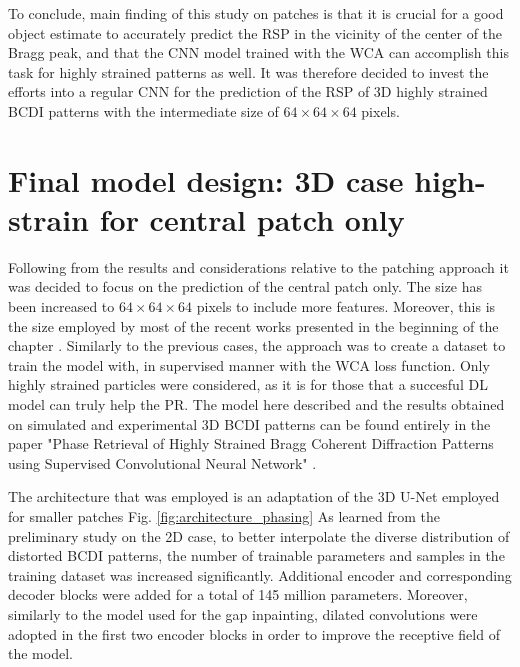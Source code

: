 To conclude, main finding of this study on patches is that it is crucial for a good object estimate to accurately predict 
the RSP in the vicinity of the center of the Bragg peak, and that the CNN model trained with the WCA can accomplish this task 
for highly strained patterns as well. It was therefore decided to invest the efforts into a regular CNN for the prediction 
of the RSP of 3D highly strained BCDI patterns with the intermediate size of $64\times64\times64$ pixels. 

\section{Final model design: 3D case high-strain for central patch only }\label{chp:3d_final_strain}

Following from the results and considerations relative to the patching approach it was decided to focus on the prediction 
of the central patch only. The size has been increased to $64\times64\times64$ pixels to include more features. Moreover, this 
is the size employed by most of the recent works presented in the beginning of the chapter \cite{yao_autophasenn_2022, wu_three-dimensional_2021, lim_convolutional_2021}. 
Similarly to the previous cases, the approach was to create a dataset to train the model with, in supervised manner with 
the WCA loss function. Only highly strained particles were considered, as it is for those that a succesful DL model can 
truly help the PR. 
The model here described and the results obtained on simulated and experimental 3D BCDI patterns can be found entirely 
in the paper "Phase Retrieval of Highly Strained Bragg Coherent Diffraction Patterns using Supervised Convolutional Neural Network" 
\cite{Masto2025}.


The architecture that was employed is an adaptation of the 3D U-Net employed for smaller patches Fig. \ref{fig:architecture_phasing}
As learned from the preliminary study on the 2D case, to better interpolate the diverse distribution of distorted BCDI patterns, 
the number of trainable parameters and samples in the training dataset was increased significantly. Additional encoder 
and corresponding decoder blocks were added for a total of 145 million parameters. Moreover, similarly to the model 
used for the gap inpainting, dilated convolutions were adopted in the first two encoder blocks in order to improve 
the receptive field of the model. 

